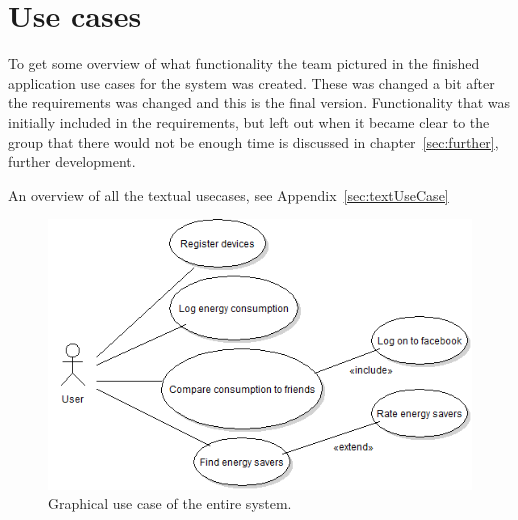 \section{Use cases}
To get some overview of what functionality the team pictured in the finished application \glspl{use case} for the system was created. These was changed a bit after the requirements was changed and this is the final version. Functionality that was initially included in the requirements, but left out when it became clear to the group that there would not be enough time is discussed in chapter~\ref{sec:further}, further development.


An overview of all the textual usecases, see Appendix~\ref{sec:textUseCase}


\begin{figure}[H]
\includegraphics[width=\textwidth]{ch/specification/fig/currentUsecase.PNG}
\caption{Graphical use case of the entire system.}
\label{fig:usecase}
\end{figure}
